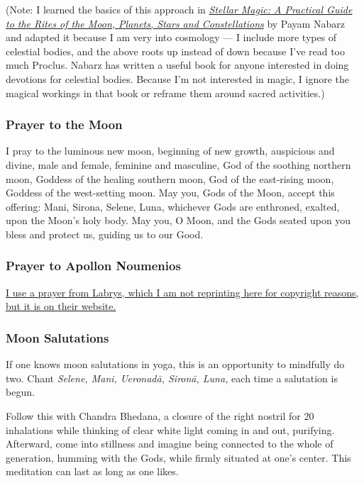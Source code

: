 \documentclass[
]{book}
\begin{document}
(Note: I learned the basics of this approach in \href{https://www.google.com/books/edition/Stellar_Magic/h6lsPgAACAAJ?hl=en}{\emph{Stellar Magic: A Practical Guide to the Rites of the Moon, Planets, Stars and Constellations}} by Payam Nabarz and adapted it because I am very into cosmology --- I include more types of celestial bodies, and the above roots up instead of down because I've read too much Proclus. Nabarz has written a useful book for anyone interested in doing devotions for celestial bodies. Because I'm not interested in magic, I ignore the magical workings in that book or reframe them around sacred activities.)

\hypertarget{prayer-to-the-moon}{%
\subsubsection{Prayer to the Moon}\label{prayer-to-the-moon}}

I pray to the luminous new moon,
beginning of new growth,
auspicious and divine,
male and female, feminine and masculine,
God of the soothing northern moon,
Goddess of the healing southern moon,
God of the east-rising moon,
Goddess of the west-setting moon.
May you, Gods of the Moon, accept this offering:
Mani, Sirona, Selene, Luna, whichever Gods are
enthroned, exalted, upon the Moon's holy body.
May you, O Moon, and the Gods seated upon you
bless and protect us, guiding us to our Good.

\hypertarget{prayer-to-apollon-noumenios}{%
\subsubsection{Prayer to Apollon Noumenios}\label{prayer-to-apollon-noumenios}}

\href{http://www.labrys.gr/en/text_noumenia.html}{I use a prayer from Labrys, which I am not reprinting here for copyright reasons, but it is on their website.}

\hypertarget{moon-salutations}{%
\subsubsection{Moon Salutations}\label{moon-salutations}}

If one knows moon salutations in yoga, this is an opportunity to mindfully do two. Chant \emph{Selene, Mani, Ueronadā, Sironā, Luna,} each time a salutation is begun.

Follow this with Chandra Bhedana, a closure of the right nostril for 20 inhalations while thinking of clear white light coming in and out, purifying. Afterward, come into stillness and imagine being connected to the whole of generation, humming with the Gods, while firmly situated at one's center. This meditation can last as long as one likes.
\end{document}
